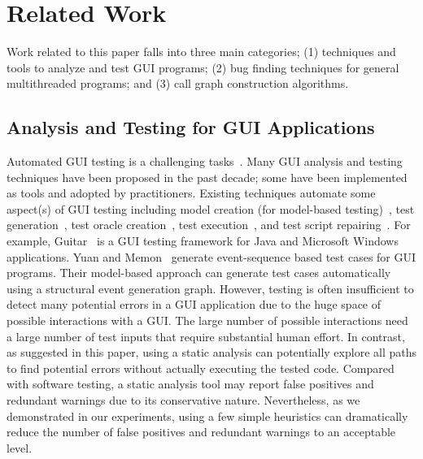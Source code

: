 \section{Related Work}

Work related to this paper falls into three main categories; (1)
techniques and tools to analyze and test GUI programs; (2)
bug finding techniques for general multithreaded programs; and (3)
call graph construction algorithms.

\subsection{Analysis and Testing for GUI Applications}

Automated GUI testing is a challenging tasks~\cite{Bertolino:2007:STR:1253532.1254712,
Harrold:2000:TR:336512.336532}.
 Many GUI analysis and testing techniques have been proposed in the past decade; some have been
implemented as tools and adopted by practitioners. Existing techniques automate
some aspect(s) of GUI testing including model creation
(for model-based testing)~\cite{androidtesting}, %
test generation~\cite{YuanMemonICSE2007},
test oracle creation~\cite{MemonFSE2000}, test execution~\cite{YuanCohenMemonTSE2011},
and test script repairing~\cite{Huang:2010:RGT:1828417.1828465, Daniel:2011:AGR:2002931.2002937}.
For example,
Guitar~\cite{YuanCohenMemonTSE2011, YuanMemonICSE2007}%
is a GUI testing framework for Java and Microsoft Windows applications. 
Yuan and Memon~\cite{YuanMemonICSE2007} generate event-sequence based test cases for GUI
programs. Their model-based approach can generate test cases automatically using a structural event
generation graph. 
However, testing is often insufficient to detect many potential
errors in a GUI application
due to the huge space of possible interactions
with a GUI. The large number of possible interactions
need a large number of test inputs that require substantial human effort.
In contrast, as suggested in this paper,
using a static analysis can potentially explore
all paths to find potential errors without actually executing the tested code. 
Compared with software testing, a static analysis tool may
report false positives and redundant warnings due to its conservative nature.
Nevertheless, as we demonstrated in our experiments, using a few simple heuristics
can dramatically reduce the number of false positives and redundant warnings to
an acceptable level.


